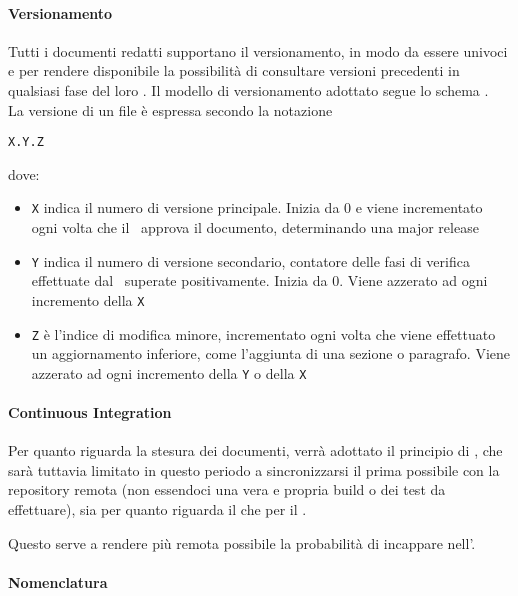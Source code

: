 			\paragraph{Versionamento} \label{Versionamento}
			Tutti i documenti redatti supportano il versionamento, in modo da essere univoci e per rendere disponibile la possibilità di consultare versioni precedenti in qualsiasi fase del loro .
			Il modello di versionamento adottato segue lo schema .\\La versione di un file è espressa secondo la notazione
			\begin{center}
				\texttt{X.Y.Z}
			\end{center}
			\indent dove:
			\begin{itemize}
				\item \texttt{X} indica il numero di versione principale. Inizia da 0 e viene incrementato ogni volta che il \Res\ approva il documento, determinando una major release
				\item \texttt{Y} indica il numero di versione secondario, contatore delle fasi di verifica effettuate dal \Ver\ superate positivamente. Inizia da 0. 	Viene azzerato ad ogni incremento della \texttt{X}
				\item \texttt{Z} è l'indice di modifica minore, incrementato ogni volta che viene effettuato un aggiornamento inferiore, come l'aggiunta di una sezione o paragrafo. Viene azzerato ad ogni incremento della \texttt{Y} o della \texttt{X}
			\end{itemize}


			\paragraph{Continuous Integration}
			Per quanto riguarda la stesura dei documenti, verrà adottato il principio di , che sarà tuttavia limitato in questo periodo
			a sincronizzarsi il prima possibile con la repository remota (non essendoci
			una vera e propria build o dei test da effettuare), sia per quanto riguarda il  che per il .

			Questo serve a rendere più remota possibile la probabilità di incappare nell'.


			\paragraph{Nomenclatura}

